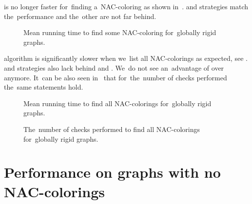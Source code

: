 \NaiveCycles{} is no longer faster for~finding a~NAC-coloring
as shown in~.
\None{} and \Neighbors{} strategies match the~performance and
the~other are not far behind.
%
\begin{figure}[thbp]
	\centering
	\scalebox{\BenchFigureScale}{}
	\caption[Mean runtime for~globally rigid graphs (some)]{
		Mean running time to find some NAC-coloring for~globally rigid graphs.}%
	\label{fig:graph_globally_rigid_first_runtime}
\end{figure}%

\NaiveCycles{} algorithm is significantly slower when we~list all NAC-colorings
as expected, see .
\None{} and \CycleMask{} strategies also lack behind \Neighbors{} and \NeighborsDegree{}.
We~do not see an~advantage of \MergeLinear{} over \SharedVertices{} anymore.
%
It~can be also seen in~
that for~the~number of checks performed the~same statements hold.
%
\begin{figure}[thbp]
	\centering
	\scalebox{\BenchFigureScale}{}
	\caption[Mean runtime for~globally rigid graphs (all)]{
		Mean running time to find all NAC-colorings for~globally rigid graphs.}%
	\label{fig:graph_globally_rigid_all_runtime}
\end{figure}%
\begin{figure}[thbp]
	\centering
	\scalebox{\BenchFigureScale}{}
	\caption[Checks performed for~globally rigid graphs (all)]{
		The~number of checks performed to find all NAC-colorings for~globally rigid graphs.}%
	\label{fig:graph_globally_rigid_all_checks}
\end{figure}%



\section{Performance on graphs with no NAC-colorings}

